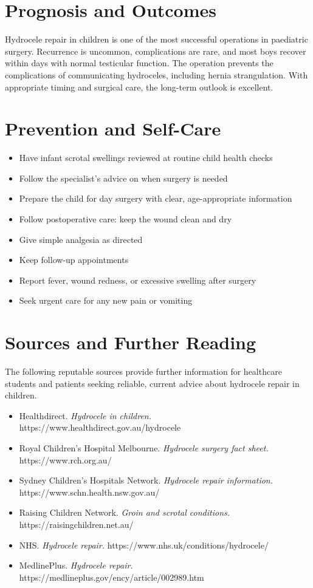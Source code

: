 \section*{Prognosis and Outcomes}
Hydrocele repair in children is one of the most successful operations in paediatric surgery. Recurrence is uncommon, complications are rare, and most boys recover within days with normal testicular function. The operation prevents the complications of communicating hydroceles, including hernia strangulation. With appropriate timing and surgical care, the long-term outlook is excellent.

\section*{Prevention and Self-Care}
\begin{itemize}
    \item Have infant scrotal swellings reviewed at routine child health checks
    \item Follow the specialist's advice on when surgery is needed
    \item Prepare the child for day surgery with clear, age-appropriate information
    \item Follow postoperative care: keep the wound clean and dry
    \item Give simple analgesia as directed
    \item Keep follow-up appointments
    \item Report fever, wound redness, or excessive swelling after surgery
    \item Seek urgent care for any new pain or vomiting
\end{itemize}

\section*{Sources and Further Reading}
The following reputable sources provide further information for healthcare students and patients seeking reliable, current advice about hydrocele repair in children.

\begin{itemize}
    \item Healthdirect. \textit{Hydrocele in children.} https://www.healthdirect.gov.au/hydrocele
    \item Royal Children's Hospital Melbourne. \textit{Hydrocele surgery fact sheet.} https://www.rch.org.au/
    \item Sydney Children's Hospitals Network. \textit{Hydrocele repair information.} https://www.schn.health.nsw.gov.au/
    \item Raising Children Network. \textit{Groin and scrotal conditions.} https://raisingchildren.net.au/
    \item NHS. \textit{Hydrocele repair.} https://www.nhs.uk/conditions/hydrocele/
    \item MedlinePlus. \textit{Hydrocele repair.} https://medlineplus.gov/ency/article/002989.htm
\end{itemize}
